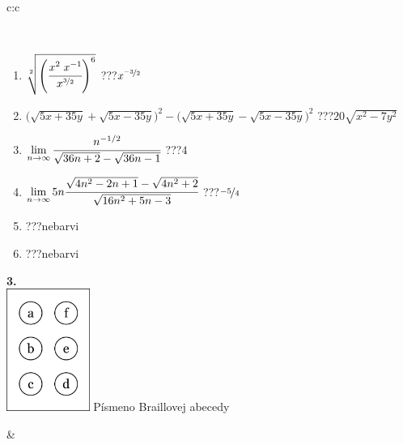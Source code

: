 \documentclass[10pt]{report}
\begin{document}
\begin{tabular}{c:c}
\begin{minipage}[c][104.5mm][t]{0.5\linewidth}
\begin{center}
\begin{minipage}{0.95\linewidth}
\begin{center}
\end{center}
\end{minipage}
\\[1mm]
\begin{minipage}{0.79\linewidth}
\begin{center}
\begin{varwidth}{\linewidth}
\begin{enumerate}
\small
\item $\sqrt[2]{\left(\cfrac{x^{2}\;x^{-1}}{x^{\nicefrac{3}{2}}}\right)^{6}}$\quad \dotfill\; ???\;\dotfill \quad $x^{\nicefrac{-3}{2}}$
\item {\footnotesize{\scriptsize$\big(\sqrt{5x+35y}+\sqrt{5x-35y}\big)^2-\big(\sqrt{5x+35y}-\sqrt{5x-35y}\big)^2$}\quad \dotfill\; ???\;\dotfill \quad $20\sqrt{x^2-7y^2}$}
\item $\lim\limits_{n\to\infty}\cfrac{n^{-1/2}}{\sqrt{36n+2}-\sqrt{36n-1}}$\quad \dotfill\; ???\;\dotfill \quad $4$
\item $\lim\limits_{n\to\infty}5n\cfrac{\sqrt{4n^2-2n+1}-\sqrt{4n^2+2}}{\sqrt{16n^2+5n-3}}$\quad \dotfill\; ???\;\dotfill \quad $\nicefrac{-5}{4}$
\item \quad \dotfill\; ???\;\dotfill \quad nebarvi
\item \quad \dotfill\; ???\;\dotfill \quad nebarvi
\end{enumerate}
\end{varwidth}
\end{center}
\end{minipage}
\begin{minipage}{0.20\linewidth}
\begin{center}
{\Huge\bfseries 3.} \\[2mm]
\includegraphics[height=40mm]{../images/braille.png}
{\small Písmeno Braillovej abecedy}
\end{center}
\end{minipage}
\end{center}
\end{minipage}
&
\begin{minipage}[c][104.5mm][t]{0.5\linewidth}
\begin{center}

\end{center}
\end{minipage}
\end{tabular}
\end{document}
